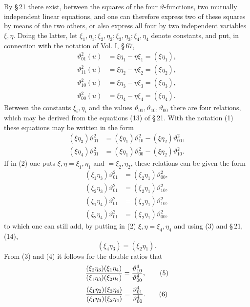 \documentclass[11pt]{article}
\providecommand{\tht}{\vartheta}
\begin{document}
By \S\,21 there exist, between the squares of the four $\vartheta$-functions, two mutually independent linear equations, and one can therefore express two of these squares by means of the two others, or also express all four by two independent variables $\xi,\eta$. Doing the latter, let $\xi_1,\eta_1;\xi_2,\eta_2;\xi_3,\eta_3;\xi_4,\eta_4$ denote constants, and put, in connection with the notation of Vol. I, \S\,67,
\begin{equation}
\begin{aligned}
\tht_{01}^{2}(u)&=\xi\eta_1-\eta\xi_1=(\xi\eta_1),\\
\tht_{11}^{2}(u)&=\xi\eta_2-\eta\xi_2=(\xi\eta_2),\\
\tht_{10}^{2}(u)&=\xi\eta_3-\eta\xi_3=(\xi\eta_3),\\
\tht_{00}^{2}(u)&=\xi\eta_4-\eta\xi_4=(\xi\eta_4).
\end{aligned}
\tag{1}
\end{equation}
Between the constants $\xi_i,\eta_i$ and the values $\tht_{01},\tht_{10},\tht_{00}$ there are four relations, which may be derived from the equations (13) of \S\,21. With the notation (1) these equations may be written in the form
\begin{equation}
\begin{aligned}
(\xi\eta_3)\tht_{01}^{2}&=(\xi\eta_1)\tht_{10}^{2}-(\xi\eta_2)\tht_{00}^{2},\\
(\xi\eta_4)\tht_{01}^{2}&=(\xi\eta_1)\tht_{00}^{2}-(\xi\eta_2)\tht_{10}^{2}.
\end{aligned}
\tag{2}
\end{equation}
If in (2) one puts $\xi,\eta=\xi_1,\eta_1$ and $=\xi_2,\eta_2$, these relations can be given the form
\begin{equation}
\begin{aligned}
(\xi_1\eta_3)\tht_{01}^{2}&=(\xi_2\eta_1)\tht_{00}^{2},\\
(\xi_2\eta_3)\tht_{01}^{2}&=(\xi_2\eta_1)\tht_{10}^{2},\\
(\xi_1\eta_4)\tht_{01}^{2}&=(\xi_2\eta_1)\tht_{10}^{2},\\
(\xi_2\eta_4)\tht_{01}^{2}&=(\xi_2\eta_1)\tht_{00}^{2},
\end{aligned}
\tag{3}
\end{equation}
to which one can still add, by putting in (2) $\xi,\eta=\xi_4,\eta_4$ and using (3) and \S\,21, (14),
\begin{equation}
(\xi_4\eta_3)=(\xi_2\eta_1).\tag{4}
\end{equation}
From (3) and (4) it follows for the double ratios that
\begin{equation}
\frac{(\xi_2\eta_3)(\xi_1\eta_4)}{(\xi_1\eta_3)(\xi_2\eta_4)}={\tht_{10}^{4}\over\tht_{00}^{4}},
\tag{5}
\end{equation}
\begin{equation}
\frac{(\xi_1\eta_2)(\xi_3\eta_4)}{(\xi_1\eta_3)(\xi_2\eta_4)}={\tht_{01}^{4}\over\tht_{00}^{4}}.
\tag{6}
\end{equation}
\end{document}
